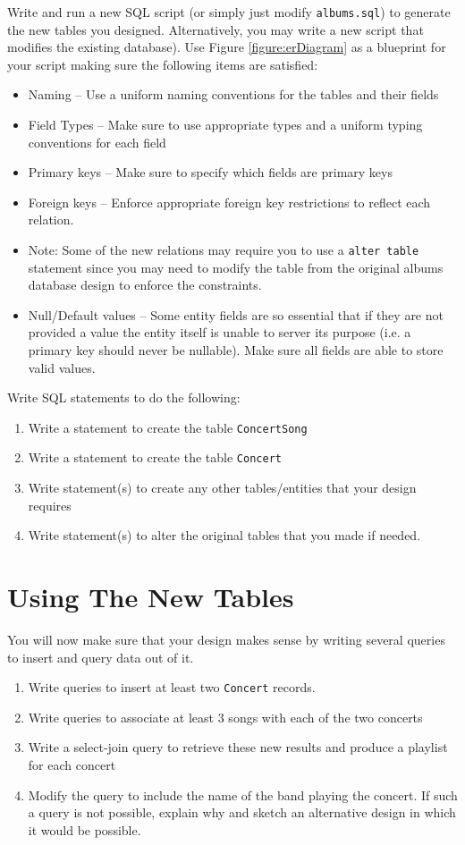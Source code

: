\documentclass[12pt]{exam}
\begin{document}
Write and run a new SQL script (or simply just modify \texttt{albums.sql}) 
to generate the new tables you designed.  Alternatively, you may write a new script 
that modifies the existing database). Use Figure \ref{figure:erDiagram} as a 
blueprint for your script making sure the following items are satisfied:
\begin{itemize}
  \item Naming -- Use a uniform naming conventions for the tables and their fields
  \item Field Types -- Make sure to use appropriate types and a uniform typing conventions for each field
  \item Primary keys -- Make sure to specify which fields are primary keys
  \item Foreign keys -- Enforce appropriate foreign key restrictions to reflect each relation.
  \item Note: Some of the new relations may require you to use a 
    \texttt{alter table} statement since you may need to modify the 
    table from the original albums database design to enforce the constraints.
  \item Null/Default values -- Some entity fields are so essential that if they are 
    not provided a value the entity itself is unable to server its purpose 
    (i.e. a primary key should never be nullable). Make sure all fields are able 
    to store valid values.
\end{itemize}

Write SQL statements to do the following: 
\begin{enumerate}
  \item Write a statement to create the table \texttt{ConcertSong}
  \item Write a statement to create the table \texttt{Concert}
  \item Write statement(s) to create any other tables/entities that your design requires
  \item Write statement(s) to alter the original tables that you made if needed.
\end{enumerate}

\section{Using The New Tables}

You will now make sure that your design makes sense by writing several queries to insert and query data out of it.
\begin{enumerate}
  \item Write queries to insert at least two \texttt{Concert} records.
  \item Write queries to associate at least 3 songs with each of the two concerts 
  \item Write a select-join query to retrieve these new results and produce a playlist for each concert
  \item Modify the query to include the name of the band playing the concert.  If such a query is not possible, explain why and sketch an alternative design in which it would be possible.
\end{enumerate}
\end{document}
